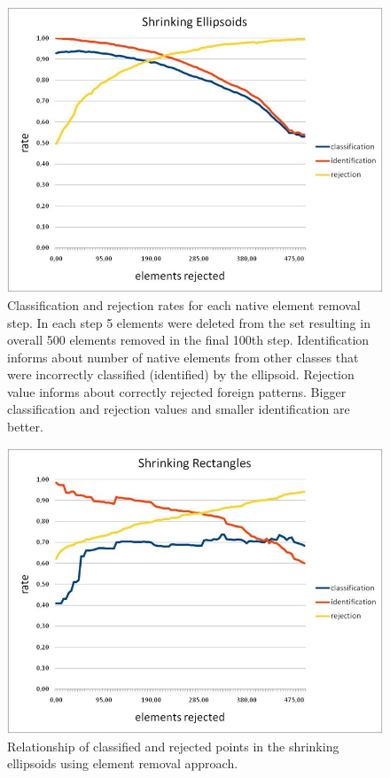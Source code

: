 \begin{figure}[htp]
	\centering
	\includegraphics[width=1.\textwidth]{Figures/shrinking_ellipsoids_elements_rejection.jpg}
	\caption{ Classification and rejection rates for each native element removal step. In each step 5 elements were deleted from the set resulting in overall 500 elements removed in the final 100th step. Identification informs about number of native elements from other classes that were incorrectly classified (identified) by the ellipsoid. Rejection value informs about correctly rejected foreign patterns. Bigger classification and rejection values and smaller identification are better. }
	\label{fig:shrinking_ellipsoids_elements_rejection}\vspace{-3pt}
\end{figure}

\begin{figure}[htp]
	\centering
	\includegraphics[width=1.\textwidth]{Figures/shrinking_rectangles_elements_rejection.jpg}
	\caption{ Relationship of classified and rejected points in the shrinking ellipsoids using element removal approach. }
	\label{fig:shrinking_ellipsoids_elements_rejection2}\vspace{-3pt}
\end{figure}

